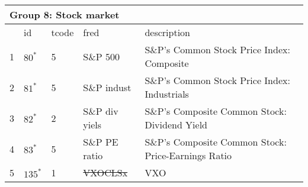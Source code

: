 \begin{table}[ht] 
\centering 
\begin{tabular}{lllll}
\multicolumn{5}{l}{Group 8: Stock market} \\
\toprule
 & id & tcode & fred & description \\
\midrule
1 & $80^*$ & 5 & S\&P 500 & S\&P's Common Stock Price Index: Composite \\
2 & $81^*$ & 5 & S\&P indust & S\&P's Common Stock Price Index: Industrials \\
3 & $82^*$ & 2 & S\&P div yiels & S\&P's Composite Common Stock: Dividend Yield \\
4 & $83^*$ & 5 & S\&P PE ratio & S\&P's Composite Common Stock: Price-Earnings Ratio \\
5 & $135^*$ & 1 & \sout{VXOCLSx} & VXO \\
\bottomrule
\end{tabular}  
\end{table} 